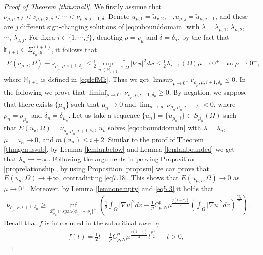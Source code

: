 \documentclass[10pt,a4paper]{article}
\theoremstyle{definition} \theoremstyle{remark}
\numberwithin{equation}{section}
\newcommand{\B}{\mathcal{B}}
\newcommand{\la}{\lambda}
\newcommand{\ga}{\gamma}
\begin{document}
\begin{proof}[Proof of Theorem \ref{thmsmall}]
We firstly assume that $\nu_{\rho,\mu,2,\delta} < \nu_{\rho,\mu,3,\delta} < \cdots < \nu_{\rho,\mu,j+1,\delta}$. Denote $u_{\mu,1} = \tilde u_{\mu,2}, \cdots, u_{\mu,j} = \tilde u_{\mu,j+1}$, and these are $j$ different sign-changing solutions of \eqref{eqonbounddomain} with $\la = \la_{\mu,1}$, $\la_{\mu,2}$, $\cdots$, $\la_{\mu,j}$. For fixed $i \in \{1,\cdots,j\}$,  denoting $\rho = \rho_\mu$ and $\delta = \delta_\mu$, by the fact that $\mathbb{M}_{i+1}  \in \Sigma_{\rho_\mu,\mu}^{(i+1)}$, it follows that
\begin{align} \label{eq7.18}
	E(u_{\mu,i},\Omega) = \nu_{\rho_\mu,\mu,i+1,\delta_\mu} \le \frac12 \sup_{u \in \mathbb{M}_{i+1}}\int_\Omega |\nabla u|^2dx \le \frac12\la_{i+1}(\Omega) \mu \to 0^+ \quad \text{as } \mu \to 0^+,
\end{align}
where $\mathbb{M}_{i+1}$ is defined in \eqref{eqdefMk}. Thus we get $\limsup_{\mu \to 0^+}\nu_{\rho_\mu,\mu,i+1,\delta_\mu} \le 0$. In the following we prove that $\liminf_{\mu \to 0^+}\nu_{\rho_\mu,\mu,i+1,\delta_\mu} \ge 0$. By negation, we suppose that there exists $\{\mu_n\}$ such that $\mu_n \to 0$ and $\lim_{n \to \infty}\nu_{\rho_n,\mu_n,i+1,\delta_n} < 0$, where $\rho_n = \rho_{\mu_n}$ and $\delta_n = \delta_{\mu_n}$. Let us take a sequence $\{u_n\} = \{u_{\mu_n,i}\} \subset S_{\mu_n}(\Omega)$ such that $E(u_n,\Omega) = \nu_{\rho_n,\mu_n,i+1,\delta_n}$, $u_n$ solves \eqref{eqonbounddomain} with $\la = \la_n$, $\mu = \mu_n \to 0$, and $m(u_n) \le i+2$. Similar to the proof of Theorem \ref{thmgenussub}, by Lemma \ref{lemlanbelow} and Lemma \ref{lemlanbounded} we get that $\la_n \to +\infty$. Following the arguments in proving Proposition \ref{proprelationship}, by using Proposition \ref{propasm} we can prove that $E(u_n,\Omega) \to +\infty$, contradicting \eqref{eq7.18}. This shows that $E(u_{\mu,i},\Omega) \to 0$ as $\mu \to 0^+$. Moreover, by Lemma \ref{lemnonempty} and \eqref{eq5.3} it holds that
\begin{align} \label{eqnuineq}
	\nu_{\rho_\mu,\mu,i+1,\delta_\mu} \geq \inf_{\B_{\rho_\mu}^\mu \cap \text{span}\{\phi_1,\cdots,\phi_{i}\}^{\bot}}\left( \frac12 \int_\Omega |\nabla u|^2dx - \frac1p C_{p,N}^p \mu^{\frac{p(1-\ga_p)}{2}}\left( \int_\Omega |\nabla u|^2dx\right) ^{\frac{p\ga_p}{2}} \right).
\end{align}
Recall that $f$ is introduced in the subcritical case by
\begin{align*}
	f(t) = \frac12 t - \frac1p C_{p,N}^p \mu^{\frac{p(1-\ga_p)}{2}}t ^{\frac{p\ga_p}{2}}, \quad t > 0,
\end{align*}

\end{proof}
\end{document}
